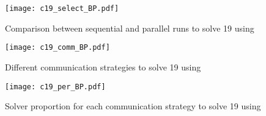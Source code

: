 \begin{figure}[!h]
\centering
\texttt{[image: c19\_select\_BP.pdf]}
\caption{Comparison between sequential and parallel runs to solve \CARRP{} 19 using \posl}
\end{figure}

\begin{figure}[!h]
\centering
\texttt{[image: c19\_comm\_BP.pdf]}
\caption{Different communication strategies to solve \CARRP{} 19 using \posl}\label{boxplot:comm}
\end{figure}

\begin{figure}[!h]
\centering
\texttt{[image: c19\_per\_BP.pdf]}
\caption{Solver proportion for each communication strategy to solve \CARRP{} 19 using \posl}\label{barplot:19}
\end{figure}